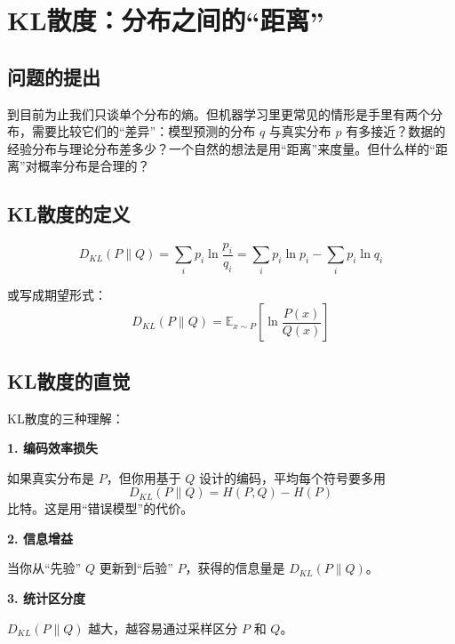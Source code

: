\section{KL散度：分布之间的“距离”}

\subsection{问题的提出}

到目前为止我们只谈单个分布的熵。但机器学习里更常见的情形是手里有两个分布，需要比较它们的“差异”：模型预测的分布 $q$ 与真实分布 $p$ 有多接近？数据的经验分布与理论分布差多少？一个自然的想法是用“距离”来度量。但什么样的“距离”对概率分布是合理的？

\subsection{KL散度的定义}

\begin{keyformula}[title=KL散度（Kullback-Leibler Divergence）]
\begin{equation}
D_{KL}(P \| Q) = \sum_i p_i \ln \frac{p_i}{q_i} = \sum_i p_i \ln p_i - \sum_i p_i \ln q_i
\end{equation}

或写成期望形式：
\begin{equation}
D_{KL}(P \| Q) = \mathbb{E}_{x \sim P} \left[ \ln \frac{P(x)}{Q(x)} \right]
\end{equation}
\end{keyformula}

\subsection{KL散度的直觉}

\begin{physicalmeaning}
KL散度的三种理解：

\textbf{1. 编码效率损失}

如果真实分布是 $P$，但你用基于 $Q$ 设计的编码，平均每个符号要多用
\[
D_{KL}(P \| Q) = H(P, Q) - H(P)
\]
比特。这是用“错误模型”的代价。

\textbf{2. 信息增益}

当你从“先验” $Q$ 更新到“后验” $P$，获得的信息量是 $D_{KL}(P \| Q)$。

\textbf{3. 统计区分度}

$D_{KL}(P \| Q)$ 越大，越容易通过采样区分 $P$ 和 $Q$。
\end{physicalmeaning}

